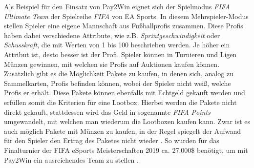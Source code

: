 Als Beispiel für den Einsatz von Pay2Win eignet sich der Spielmodus \textit{FIFA Ultimate Team} der Spielreihe \textit{FIFA} von EA Sports. In diesem Mehrspieler-Modus stellen Spieler eine eigene Mannschaft aus Fußballprofis zusammen. Diese Profis haben dabei verschiedene Attribute, wie z.B. \textit{Sprintgeschwindigkeit} oder \textit{Schusskraft}, die mit Werten von 1 bis 100 beschrieben werden. Je höher ein Attribut ist, desto besser ist der Profi. Spieler können in Turnieren und Ligen Münzen gewinnen, mit welchen sie Profis auf Auktionen kaufen können. Zusätzlich gibt es die Möglichkeit Pakete zu kaufen, in denen sich, analog zu Sammelkarten, Profis befinden können, wobei der Spieler nicht weiß, welche Profis er erhält. Diese Pakete können ebenfalls mit Echtgeld gekauft werden und erfüllen somit die Kriterien für eine Lootbox. Hierbei werden die Pakete nicht direkt gekauft, stattdessen wird das Geld in sogenannte \textit{FIFA Points} umgewandelt, mit welchen man wiederum die Lootboxen kaufen kann. Zwar ist es auch möglich Pakete mit Münzen zu kaufen, in der Regel spiegelt der Aufwand für den Spieler den Ertrag des Paketes nicht wieder \citep[S. 188]{Tregel2020}. So wurden für das Finalturnier der FIFA eSports Meisterschaften 2019 ca. 27.000\$ benötigt, um mit Pay2Win ein ausreichendes Team zu stellen \citep{Akerman2019}.